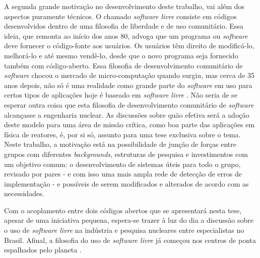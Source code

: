 A segunda grande motivação no desenvolvimento deste trabalho, vai além dos aspectos puramente técnicos.
O chamado \textit{software livre} consiste em códigos desenvolvidos dentro de uma filosofia de liberdade e de uso
comunitário. Essa ideia, que remonta ao início dos anos 80, advoga que um programa ou \textit{software} deve fornecer
o código-fonte aos usuários. Os usuários têm direito de modificá-lo, melhorá-lo e até mesmo vendê-lo, desde que o novo
programa seja fornecido também com código-aberto. Essa filosofia de desenvolvimento comunitário de \textit{software}
chocou o mercado de micro-computação quando surgiu, mas cerca de 35 anos depois, não só é uma realidade como
grande parte do \textit{software} em uso para certos tipos de aplicações hoje é baseado em \textit{software livre}
\cite{Androutsellis2010}. Não seria de se esperar outra coisa que esta filosofia de desenvolvimento comunitário de
\textit{software} alcançasse a engenharia nuclear. As discussões sobre quão efetiva será a adoção deste modelo
para uma área de missão crítica, como boa parte das aplicações em física de reatores, é, por si só, assunto para uma
tese exclusiva sobre o tema. Neste trabalho, a motivação está na possibilidade de junção de forças entre grupos com
diferentes \textit{backgrounds}, estruturas de pesquisa e investimentos com um objetivo comum: o desenvolvimento
de sistemas úteis para todo o grupo, revisado por pares - e com isso uma mais ampla rede de detecção de erros
de implementação - e possíveis de serem modificados e alterados de acordo com as necessidades.

Com o acoplamento entre dois códigos abertos que se apresentará nesta tese, apesar
de uma iniciativa pequena, espera-se trazer à luz do dia a discussão sobre o uso de \textit{software livre} na
indústria e pesquisa nucleares entre especialistas no Brasil. Afinal, a filosofia do uso de \textit{software livre}
já começou nos centros de ponta espalhados pelo planeta \cite{Romano2013, Boyd2014, Huff2016}.





